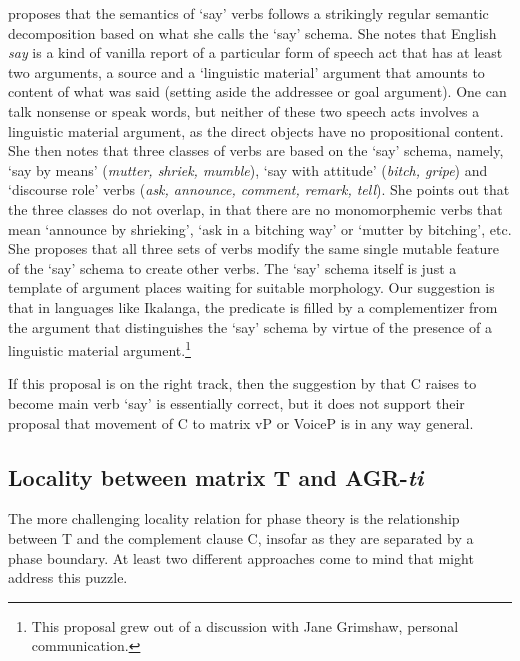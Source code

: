 \documentclass[output=paper,
modfonts
]{langscibook}
\begin{document}
\citet{Grimshaw2015} proposes that the semantics of  `say' verbs follows a strikingly regular semantic decomposition based on what she calls the `say' schema. She notes that English \textit{say} is a kind of vanilla report of a particular form of speech act that has at least two arguments, a source and a `linguistic material' argument that amounts to content of what was said (setting aside the addressee or goal argument). One can talk nonsense or speak words, but neither of these two speech acts involves a linguistic material argument, as the direct objects have no propositional content. She then notes that three classes of verbs are based on the `say' schema, namely, `say by means' (\textit{mutter, shriek, mumble}), `say with attitude' (\textit{bitch, gripe}) and `discourse role' verbs (\textit{ask, announce, comment, remark, tell}). She points out that the three classes do not overlap, in that there are no monomorphemic verbs that mean `announce by shrieking', `ask in a bitching way' or `mutter by bitching', etc. She proposes that all three sets of verbs modify the same single mutable feature of the `say' schema to create other verbs. The `say' schema itself is just a template of argument places waiting for suitable morphology. Our suggestion is that in languages like Ikalanga, the predicate is filled by a complementizer from the argument that distinguishes the `say' schema by virtue of the presence of a linguistic material argument.\footnote{This proposal grew out of a discussion with Jane Grimshaw, personal communication.}

If this proposal is on the right track, then the suggestion by \citeauthor{Diercks2017a} that C raises to become main verb `say' is essentially correct, but it does not support their proposal that movement of C to matrix vP or VoiceP is in any way general.

 

\subsection{Locality between matrix T and AGR-\textit{ti}}\label{letsholo:s3.5}

The more challenging locality relation for phase theory is the relationship between T and the complement clause C, insofar as they are separated by a phase boundary. At least two different approaches come to mind that might address this puzzle.
\end{document}
